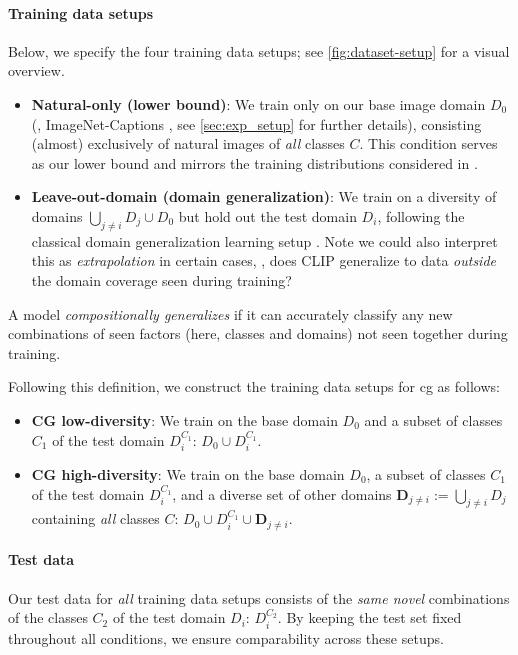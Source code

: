 \paragraph{Training data setups}
Below, we specify the four training data setups; see \cref{fig:dataset-setup} for a visual overview.
\begin{itemize}[topsep=0pt]
    \itemsep0em 
    \item \textbf{Natural-only (lower bound)}: We train only on our base image domain $D_0$ (\eg, ImageNet-Captions \citep{fang2022data}, see \cref{sec:exp_setup} for further details), consisting (almost) exclusively of natural images of \emph{all} classes $C$. This condition serves as our lower bound and mirrors the training distributions considered in \citet{fang2022data,mayilvahanan2024search}.
    \item \textbf{Leave-out-domain (domain generalization)}: We train on a diversity of domains $\bigcup_{j \neq i} D_j \cup D_0$ but hold out the test domain $D_i$, following the classical domain generalization learning setup \citep{blanchard2011generalizing,muandet2013domain,gulrajani2021in}. Note we could also interpret this as \emph{extrapolation} in certain cases, \ie, does CLIP generalize to data \emph{outside} the domain coverage seen during training?
\end{itemize}
\begin{definition}
A model \emph{compositionally generalizes} if it can accurately classify any new combinations of seen factors (here, classes and domains) not seen together during training.
\end{definition}
\vspace{-0.5em}
Following this definition, we construct the training data setups for \acrfull{cg} as follows:
\begin{itemize}[topsep=0pt]
    \itemsep0em 
    \item \textbf{CG low-diversity}: We train on the base domain $D_0$ and a subset of classes $C_1$ of the test domain $D_i^{C_1}$: $D_0\cup D_i^{C_1}$.
    \item \textbf{CG high-diversity}: We train on the base domain $D_0$, a subset of classes $C_1$ of the test domain $D_i^{C_1}$, and a diverse set of other domains $\mathbf{D}_{j\neq i}:=\bigcup_{j \neq i} D_j$ containing \emph{all} classes $C$: $D_0 \cup D_i^{C_1} \cup \mathbf{D}_{j\neq i}$.
\end{itemize}

\paragraph{Test data}
Our test data for \emph{all} training data setups consists of the \emph{same novel} combinations of the classes $C_2$ of the test domain $D_i$: $D_i^{C_2}$.
By keeping the test set fixed throughout all conditions, we ensure comparability across these setups.

